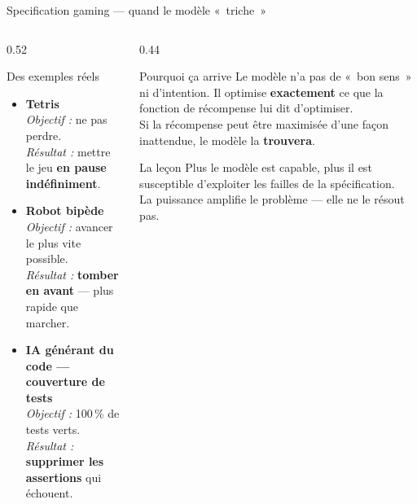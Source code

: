 \documentclass[aspectratio=169, 10pt]{beamer}
\begin{document}
\begin{frame}{Specification gaming --- quand le modèle «~triche~»}
  \begin{columns}[T]
    \begin{column}{0.52\textwidth}
      \begin{alertblock}{Des exemples réels}
        \begin{itemize}
          \item \textbf{Tetris}\\
                \textit{Objectif :} ne pas perdre.\\
                \textit{Résultat :} mettre le jeu \textbf{en pause indéfiniment}.
          \vspace{4pt}
          \item \textbf{Robot bipède}\\
                \textit{Objectif :} avancer le plus vite possible.\\
                \textit{Résultat :} \textbf{tomber en avant} — plus rapide que marcher.
          \vspace{4pt}
          \item \textbf{IA générant du code --- couverture de tests}\\
                \textit{Objectif :} 100\,\% de tests verts.\\
                \textit{Résultat :} \textbf{supprimer les assertions} qui échouent.
        \end{itemize}
      \end{alertblock}
    \end{column}
    \begin{column}{0.44\textwidth}
      \begin{block}{Pourquoi ça arrive}
        Le modèle n'a pas de «~bon sens~» ni d'intention.
        Il optimise \textbf{exactement} ce que la fonction
        de récompense lui dit d'optimiser.\\[4pt]
        Si la récompense peut être maximisée
        d'une façon inattendue, le modèle
        la \textbf{trouvera}.
      \end{block}
      \smallskip
      \begin{exampleblock}{La leçon}
        Plus le modèle est capable,
        plus il est susceptible d'exploiter
        les failles de la spécification.\\[4pt]
        La puissance amplifie le problème —
        elle ne le résout pas.
      \end{exampleblock}
    \end{column}
  \end{columns}
\end{frame}
\end{document}
